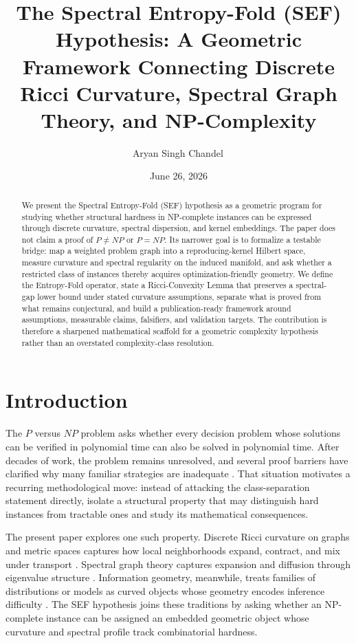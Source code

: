 \documentclass{svjour3}
\title{The Spectral Entropy-Fold (SEF) Hypothesis: A Geometric Framework Connecting Discrete Ricci Curvature, Spectral Graph Theory, and NP-Complexity}
\author{Aryan Singh Chandel\,\orcidlink{0009-0007-1774-2480}}
\institute{Aryan Singh Chandel \at
RJIT (Rustamji Institute of Technology), Gwalior, India \\
\email{aryansingh19gh@gmail.com}}
\date{June 26, 2026}
\begin{document}
\maketitle

\begin{abstract}
We present the Spectral Entropy-Fold (SEF) hypothesis as a geometric program for studying whether structural hardness in NP-complete instances can be expressed through discrete curvature, spectral dispersion, and kernel embeddings. The paper does not claim a proof of $P \neq NP$ or $P = NP$. Its narrower goal is to formalize a testable bridge: map a weighted problem graph into a reproducing-kernel Hilbert space, measure curvature and spectral regularity on the induced manifold, and ask whether a restricted class of instances thereby acquires optimization-friendly geometry. We define the Entropy-Fold operator, state a Ricci-Convexity Lemma that preserves a spectral-gap lower bound under stated curvature assumptions, separate what is proved from what remains conjectural, and build a publication-ready framework around assumptions, measurable claims, falsifiers, and validation targets. The contribution is therefore a sharpened mathematical scaffold for a geometric complexity hypothesis rather than an overstated complexity-class resolution.
\end{abstract}

\section{Introduction}
The $P$ versus $NP$ problem asks whether every decision problem whose solutions can be verified in polynomial time can also be solved in polynomial time. After decades of work, the problem remains unresolved, and several proof barriers have clarified why many familiar strategies are inadequate \citep{cook1971complexity,baker1975relativizations,razborov1997natural,aaronson2009algebrization}. That situation motivates a recurring methodological move: instead of attacking the class-separation statement directly, isolate a structural property that may distinguish hard instances from tractable ones and study its mathematical consequences.

The present paper explores one such property. Discrete Ricci curvature on graphs and metric spaces captures how local neighborhoods expand, contract, and mix under transport \citep{ollivier2009ricci,lin2011ricci}. Spectral graph theory captures expansion and diffusion through eigenvalue structure \citep{chung1997spectral}. Information geometry, meanwhile, treats families of distributions or models as curved objects whose geometry encodes inference difficulty \citep{amari2016information}. The SEF hypothesis joins these traditions by asking whether an NP-complete instance can be assigned an embedded geometric object whose curvature and spectral profile track combinatorial hardness.
\end{document}
